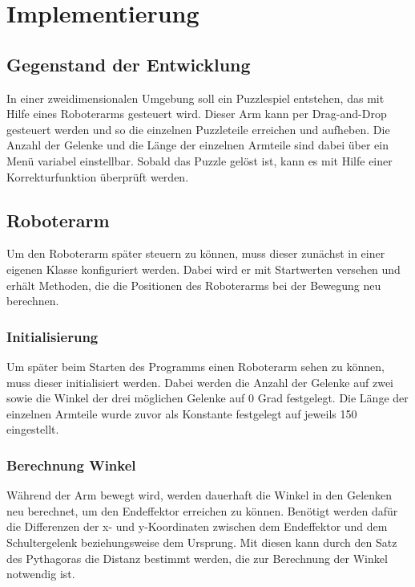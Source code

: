\documentclass[12pt]{article}
\begin{document}
    \section{Implementierung}

    \subsection{Gegenstand der Entwicklung}
    In einer zweidimensionalen Umgebung soll ein Puzzlespiel entstehen, das mit Hilfe eines Roboterarms
    gesteuert wird. Dieser Arm kann per Drag-and-Drop gesteuert werden und so die einzelnen Puzzleteile
    erreichen und aufheben. Die Anzahl der Gelenke und die Länge der einzelnen Armteile sind dabei über
    ein Menü variabel einstellbar. Sobald das Puzzle gelöst ist, kann es mit Hilfe einer Korrekturfunktion
    überprüft werden.

    \subsection{Roboterarm}
    Um den Roboterarm später steuern zu können, muss dieser zunächst in einer eigenen Klasse konfiguriert
    werden. Dabei wird er mit Startwerten versehen und erhält Methoden, die die Positionen des Roboterarms
    bei der Bewegung neu berechnen.

    \subsubsection{Initialisierung}
    Um später beim Starten des Programms einen Roboterarm sehen zu können, muss dieser initialisiert
    werden. Dabei werden die Anzahl der Gelenke auf zwei sowie die Winkel der drei möglichen Gelenke
    auf 0 Grad festgelegt. Die Länge der einzelnen Armteile wurde zuvor als Konstante festgelegt auf
    jeweils 150 eingestellt. \\

    

    \subsubsection{Berechnung Winkel}
    Während der Arm bewegt wird, werden dauerhaft die Winkel in den Gelenken neu berechnet, um den
    Endeffektor erreichen zu können. Benötigt werden dafür die Differenzen der x- und y-Koordinaten
    zwischen dem Endeffektor und dem Schultergelenk beziehungsweise dem Ursprung. Mit diesen kann durch
    den Satz des Pythagoras die Distanz bestimmt werden, die zur Berechnung der Winkel notwendig ist.
\end{document}
